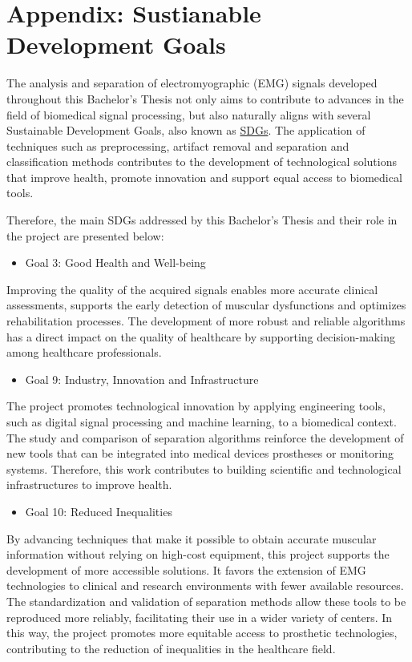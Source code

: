 
\chapter{Appendix: Sustianable Development Goals}
The analysis and separation of electromyographic (EMG) signals developed
throughout this Bachelor's Thesis not only aims to contribute to advances in the
field of biomedical signal processing, but also naturally aligns with several
Sustainable Development Goals, also known as
\href{https://sdgs.un.org/goals}{SDGs}. The application of techniques such as
preprocessing, artifact removal and separation and classification methods
contributes to the development of technological solutions that improve health,
promote innovation and support equal access to biomedical tools.

Therefore, the main SDGs addressed by this Bachelor's Thesis and their role in
the project are presented below:

\begin{itemize}
    \item Goal 3: Good Health and Well-being
\end{itemize}

Improving the quality of the acquired signals enables more accurate clinical
assessments, supports the early detection of muscular dysfunctions and optimizes
rehabilitation processes. The development of more robust and reliable algorithms
has a direct impact on the quality of healthcare by supporting decision-making
among healthcare professionals.

\begin{itemize}
    \item Goal 9: Industry, Innovation and Infrastructure
\end{itemize}

The project promotes technological innovation by applying engineering tools, such as digital signal processing and machine learning, to a
biomedical context. The study and comparison of separation algorithms reinforce
the development of new tools that can be integrated into medical devices prostheses or monitoring systems. Therefore, this work
contributes to building scientific and technological infrastructures to improve health.

\begin{itemize}
    \item Goal 10: Reduced Inequalities
\end{itemize}

By advancing techniques that make it possible to obtain accurate muscular
information without relying on high-cost equipment, this project supports the
development of more accessible solutions. It favors the extension of EMG technologies to clinical and research environments with fewer available
resources. The standardization and validation of separation methods allow these tools to be reproduced more reliably, facilitating their use in a wider variety of centers. In this way, the project promotes more equitable access to prosthetic technologies, contributing to the reduction of inequalities in the
healthcare field.